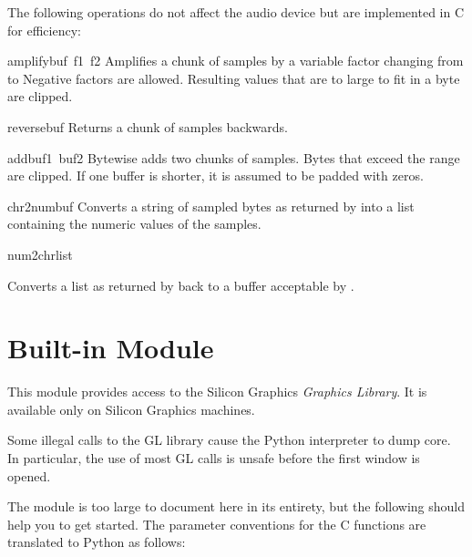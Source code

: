 The following operations do not affect the audio device but are
implemented in C for efficiency:

\renewcommand{\indexsubitem}{(in module audio)}
\begin{funcdesc}{amplify}{buf\, f1\, f2}
Amplifies a chunk of samples by a variable factor changing from
 to 
Negative factors are allowed.
Resulting values that are to large to fit in a byte are clipped.         
\end{funcdesc}

\begin{funcdesc}{reverse}{buf}
Returns a chunk of samples backwards.
\end{funcdesc}

\begin{funcdesc}{add}{buf1\, buf2}
Bytewise adds two chunks of samples.
Bytes that exceed the range are clipped.
If one buffer is shorter, it is assumed to be padded with zeros.
\end{funcdesc}

\begin{funcdesc}{chr2num}{buf}
Converts a string of sampled bytes as returned by  into
a list containing the numeric values of the samples.
\end{funcdesc}

\begin{funcdesc}{num2chr}{list}
\begin{sloppypar}
Converts a list as returned by
back to a buffer acceptable by
.
\end{sloppypar}
\end{funcdesc}

\section{Built-in Module }

This module provides access to the Silicon Graphics
{\em Graphics Library}.
It is available only on Silicon Graphics machines.

Some illegal calls to the GL library cause the Python interpreter to dump
core.
In particular, the use of most GL calls is unsafe before the first
window is opened.

The module is too large to document here in its entirety, but the
following should help you to get started.
The parameter conventions for the C functions are translated to Python as
follows:

